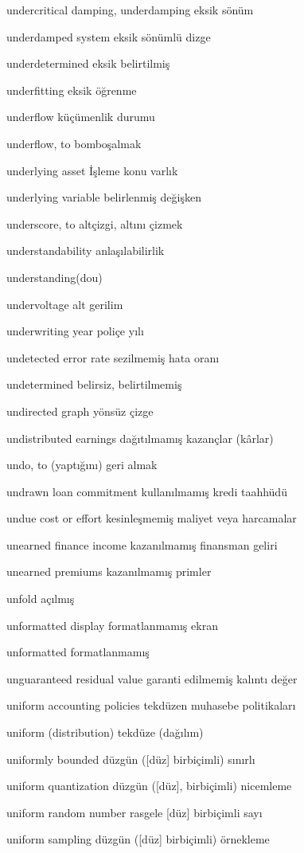 \documentclass[12pt,fleqn]{article}\usepackage{../../common}
\begin{document}
undercritical damping, underdamping eksik sönüm

underdamped system eksik sönümlü dizge

underdetermined eksik belirtilmiş

underfitting eksik öğrenme

underflow küçümenlik durumu

underflow, to bomboşalmak

underlying asset İşleme konu varlık

underlying variable belirlenmiş değişken

underscore, to altçizgi, altını çizmek

understandability anlaşılabilirlik

understanding(dou)

undervoltage alt gerilim

underwriting year poliçe yılı

undetected error rate sezilmemiş hata oranı

undetermined belirsiz, belirtilmemiş

undirected graph yönsüz çizge

undistributed earnings dağıtılmamış kazançlar (kârlar)

undo, to (yaptığını) geri almak

undrawn loan commitment kullanılmamış kredi taahhüdü

undue cost or effort kesinleşmemiş maliyet veya harcamalar

unearned finance income kazanılmamış finansman geliri

unearned premiums kazanılmamış primler

unfold açılmış

unformatted display formatlanmamış ekran

unformatted formatlanmamış

unguaranteed residual value garanti edilmemiş kalıntı değer

uniform accounting policies tekdüzen muhasebe politikaları

uniform (distribution) tekdüze (dağılım)

uniformly bounded düzgün ([düz] birbiçimli) sınırlı

uniform quantization düzgün ([düz], birbiçimli) nicemleme 

uniform random number rasgele [düz] birbiçimli sayı

uniform sampling düzgün ([düz] birbiçimli) örnekleme
\end{document}
